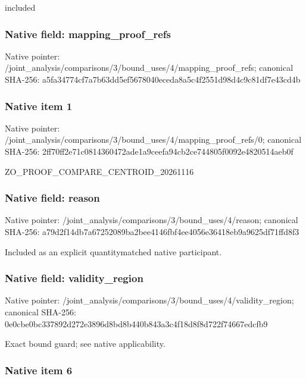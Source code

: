 \documentclass[10pt,a4paper]{article}
\begin{document}
included


\subsubsection{Native field: mapping\_proof\_refs}


Native pointer: /joint\_analysis/comparis\allowbreak{}ons/3/bound\_uses/4/mappi\allowbreak{}ng\_proof\_refs; canonical SHA-256: a5fa34774cf7a7b63dd5ef56\allowbreak{}78040eceda8a5c4f2551d98d\allowbreak{}4c9c81df7e43cd4b



\subsubsection{Native item 1}


Native pointer: /joint\_analysis/comparis\allowbreak{}ons/3/bound\_uses/4/mappi\allowbreak{}ng\_proof\_refs/0; canonical SHA-256: 2ff70ff2e71c0814360472ad\allowbreak{}e1a9ceefa94cb2ce744805f0\allowbreak{}092e4820514aeb0f


ZO\_PROOF\_COMPARE\_CENTROID\_20261116


\subsubsection{Native field: reason}


Native pointer: /joint\_analysis/comparis\allowbreak{}ons/3/bound\_uses/4/reaso\allowbreak{}n; canonical SHA-256: a79d2f14db7a67252089ba2b\allowbreak{}ee4146fbf4ee4056e36418eb\allowbreak{}9a9625df71ffd8f3


Included as an explicit quantitymatched native participant.


\subsubsection{Native field: validity\_region}


Native pointer: /joint\_analysis/comparis\allowbreak{}ons/3/bound\_uses/4/valid\allowbreak{}ity\_region; canonical SHA-256: 0e0cbe0bc337892d272e3896\allowbreak{}d8bd8b440b843a3c4f18d8f8\allowbreak{}d722f74667edcfb9


Exact bound guard; see native applicability.


\subsubsection{Native item 6}
\end{document}
